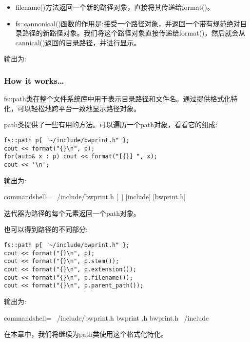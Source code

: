 \begin{itemize}
\begin{itemize}
\item 
filename()方法返回一个新的路径对象，直接将其传递给format()。

\item 
fs::cannonical()函数的作用是:接受一个路径对象，并返回一个带有规范绝对目录路径的新路径对象。我们将这个路径对象直接传递给format()，然后就会从cannical()返回的目录路径，并进行显示。
\end{itemize}

输出为:


\end{itemize}

\subsubsection{How it works…}

fs::path类在整个文件系统库中用于表示目录路径和文件名。通过提供格式化特化，可以轻松地跨平台一致地显示路径对象。

path类提供了一些有用的方法。可以遍历一个path对象，看看它的组成:

\begin{lstlisting}[style=styleCXX]
fs::path p{ "~/include/bwprint.h" };
cout << format("{}\n", p);
for(auto& x : p) cout << format("[{}] ", x);
cout << '\n';
\end{lstlisting}

输出为:

\begin{tcblisting}{commandshell={}}
~/include/bwprint.h
[~] [include] [bwprint.h]
\end{tcblisting}

迭代器为路径的每个元素返回一个path对象。

也可以得到路径的不同部分:

\begin{lstlisting}[style=styleCXX]
fs::path p{ "~/include/bwprint.h" };
cout << format("{}\n", p);
cout << format("{}\n", p.stem());
cout << format("{}\n", p.extension());
cout << format("{}\n", p.filename());
cout << format("{}\n", p.parent_path());
\end{lstlisting}

输出为:

\begin{tcblisting}{commandshell={}}
~/include/bwprint.h
bwprint
.h
bwprint.h
~/include
\end{tcblisting}

在本章中，我们将继续为path类使用这个格式化特化。



